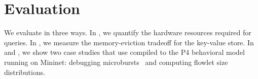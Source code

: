 \section{Evaluation}
\label{sec:eval}


We evaluate \TheSystem in three ways. In , we quantify the
hardware resources required for \TheSystem queries. In
, we measure the memory-eviction tradeoff for the key-value
store. In  and , we show two case
studies that use \TheSystem compiled to the P4 behavioral model running on
Mininet: debugging microbursts~\cite{tpp} and computing flowlet size
distributions.





